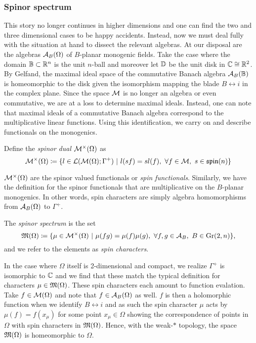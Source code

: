 \subsubsection{Spinor spectrum}

This story no longer continues in higher dimensions and one can find the two and three dimensional cases to be happy accidents.  Instead, now we must deal fully with the situation at hand to dissect the relevant algebras. At our disposal are the algebras $\mathcal{A}_{B}(\Omega)$ of $B$-planar monogenic fields. Take the case where the domain $\mathbb{B} \subset \mathbb{R}^n$ is the unit $n$-ball and moreover let $\mathbb{D}$ be the unit disk in $\mathbb{C} \cong \mathbb{R}^2$.  By Gelfand, the maximal ideal space of the commutative Banach algebra $\mathcal{A}_{B}(\mathbb{B})$ is homeomorphic to the disk given the isomorphism mapping the blade $B \leftrightarrow i$ in the complex plane. Since the space $\mathcal{M}$ is no longer an algebra or even commutative, we are at a loss to determine maximal ideals.  Instead, one can note that maximal ideals of a commutative Banach algebra correspond to the multiplicative linear functions.  Using this identification, we carry on and describe functionals on the monogenics.

\begin{definition}
    Define the \emph{spinor dual} $\mathcal{M}^\times(\Omega)$ as
    \[
        \mathcal{M}^\times(\Omega) \coloneqq \{ l \in \mathcal{L}(\mathcal{M}(\Omega); \Gamma^+) ~\vert~ l(sf) = sl(f), ~\forall f \in \mathcal{M}, ~s \in \mathfrak{spin}(n) \}
    \]
\end{definition}
$\mathcal{M}^\times(\Omega)$ are the spinor valued functionals or \emph{spin functionals}. Similarly, we have the definition for the spinor functionals that are multiplicative on the $B$-planar monogenics. In other words, spin characters are simply algebra homomorphisms from $\mathcal{A}_{B}(\Omega)$ to $\Gamma^+$.
\begin{definition}
    The \emph{spinor spectrum} is the set
    \[
        \mathfrak{M}(\Omega) \coloneqq \{ \mu \in \mathcal{M}^\times(\Omega) ~\vert~ \mu(fg) = \mu(f)\mu(g),~ \forall f,g \in \mathcal{A}_{B}, ~ B \in \operatorname{Gr}(2,n)\},
    \]
    and we refer to the elements as \emph{spin characters}.
\end{definition}

In the case where $\Omega$ itself is 2-dimensional and compact, we realize $\Gamma^+$ is isomorphic to $\mathbb{C}$ and we find that these match the typical definition for characters $\mu\in \mathfrak{M}(\Omega)$.  These spin characters each amount to function evalation. Take $f\in \mathcal{M}(\Omega)$ and note that $f \in \mathcal{A}_{B}(\Omega)$ as well.  $f$ is then a holomorphic function when we identify $B \leftrightarrow i$ and as such the spin character $\mu$ acts by $\mu(f)=f(x_\mu)$ for some point $x_\mu \in \Omega$ showing the correspondence of points in $\Omega$ with spin characters in $\mathfrak{M}(\Omega)$. Hence, with the weak-$\ast$ topology, the space $\mathfrak{M}(\Omega)$ is homeomorphic to $\Omega$. 

